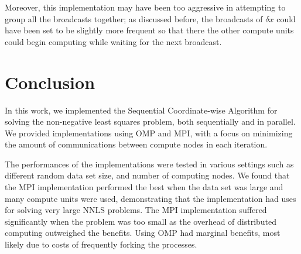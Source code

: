 \documentclass{article}
\begin{document}
Moreover, this implementation may have been too aggressive in attempting to group all the broadcasts together; as discussed before, the broadcasts of $\delta x$ could have been set to be slightly more frequent so that there the other compute units could begin computing while waiting for the next broadcast.

\section*{Conclusion}

In this work, we implemented the Sequential Coordinate-wise Algorithm for solving the non-negative least squares problem, both sequentially and in parallel. We provided implementations using OMP and MPI, with a focus on minimizing the amount of communications between compute nodes in each iteration.

The performances of the implementations were tested in various settings such as different random data set size, and number of computing nodes. We found that the MPI implementation performed the best when the data set was large and many compute units were used, demonstrating that the implementation had uses for solving very large NNLS problems. The MPI implementation suffered significantly when the problem was too small as the overhead of distributed computing outweighed the benefits. Using OMP had marginal benefits, most likely due to costs of frequently forking the processes.


















\end{document}
